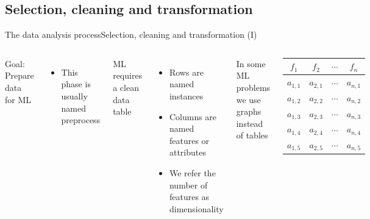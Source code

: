 \documentclass[10pt,compress]{beamer} %
\begin{document}
\subsection{Selection, cleaning and transformation}
\begin{frame}{The data analysis process}{Selection, cleaning and transformation (I)}
	\begin{columns}
	Goal: Prepare data for ML
		\begin{itemize}
		\item This phase is usually named \alert{preprocess}
		\end{itemize}

	ML requires a clean data table
	 \begin{itemize}
	 	\item Rows are named \alert{instances}
		\item Columns are named \alert{features} or \alert{attributes}
		\item We refer the number of features as \alert{dimensionality}
	 \end{itemize}
	In some ML problems we use graphs instead of tables

		\begin{center}
		\begin{tabular}{cccc}\hline
		 	$f_1$     & $f_2$     & $\cdots$ & $f_n$     \\\hline
		 	$a_{1,1}$ & $a_{2,1}$ & $\cdots$ & $a_{n,1}$ \\
		 	$a_{1,2}$ & $a_{2,2}$ & $\cdots$ & $a_{n,2}$ \\
		 	$a_{1,3}$ & $a_{2,3}$ & $\cdots$ & $a_{n,3}$ \\
		 	$a_{1,4}$ & $a_{2,4}$ & $\cdots$ & $a_{n,4}$ \\
		 	$a_{1,5}$ & $a_{2,5}$ & $\cdots$ & $a_{n,5}$ \\
		 	\hline
		\end{tabular}
		\end{center}
	\end{columns}
\end{frame}
\end{document}
